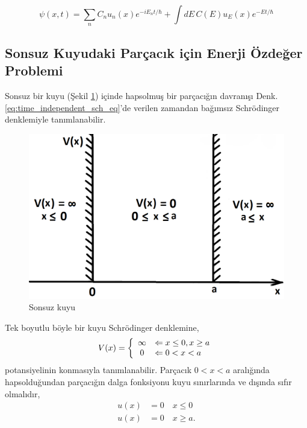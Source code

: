 \documentclass[a4paper,12pt, twoside]{article}
\begin{document}
\begin{equation}
\psi ( x , t ) = \sum _ { n } C _ { n } u _ { n } ( x ) e ^ { - i E _ { n } t / \hbar } + \int d E \, C ( E ) u _ { E } ( x ) e ^ { - E t / \hbar }
\end{equation}


\subsection{Sonsuz Kuyudaki Parçacık için Enerji Özdeğer Problemi}

Sonsuz bir kuyu (Şekil \ref{fig:infinite_well}) içinde hapsolmuş bir parçacığın davranışı Denk. \ref{eq:time_independent_sch_eq}'de verilen zamandan bağımsız Schrödinger denklemiyle tanımlanabilir.
\begin{figure}[hbtp]
\center
\includegraphics[scale=.65]{infinite_well.png}
\caption{Sonsuz kuyu}
\label{fig:infinite_well}
\end{figure}
Tek boyutlu böyle bir kuyu Schrödinger denklemine,
\begin{equation}
V ( x ) = \left\{
\begin{array} { c l } 
{ \infty } & { \Leftarrow x \leq 0 , x \geq a } \\ 
{ 0 } & { \Leftarrow 0 < x < a } \end{array} 
\right.
\label{eq:infinite_well}
\end{equation}
potansiyelinin konmasıyla tanımlanabilir. Parçacık $0<x<a$ aralığında hapsolduğundan parçacığın dalga fonksiyonu kuyu sınırlarında ve dışında sıfır olmalıdır,
\begin{align*} 
u ( x ) &= 0 \quad x \leq 0 \\ 
u ( x ) &= 0 \quad x \geq a .
\end{align*}
\end{document}
